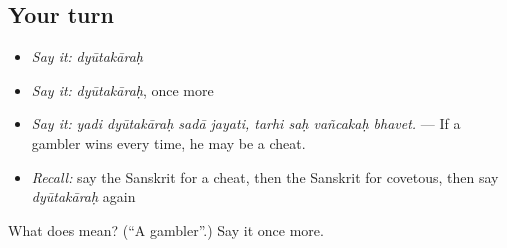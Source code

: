 \subsection*{Your turn}
\begin{itemize}
\raggedright
  \item \emph{Say it:} \emph{dyūtakāraḥ}
  \item \emph{Say it:} \emph{dyūtakāraḥ}, once more
  \item \emph{Say it:} \emph{yadi dyūtakāraḥ sadā jayati, tarhi saḥ vañcakaḥ bhavet.} — If a gambler wins every time, he may be a cheat.
  \item \emph{Recall:} say the Sanskrit for a cheat, then the Sanskrit for covetous, then say \emph{dyūtakāraḥ} again
\end{itemize}

\begin{tcolorbox}[breakable,colback=teal!4,colframe=teal!35!black,title={Before you move on}]
What does  mean? (\textquotedblleft{}A gambler\textquotedblright{}.) Say it once more.
\end{tcolorbox}
